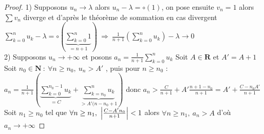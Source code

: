 			
			
		\begin{proof}
			{\small 1)} Supposons $u_n \to \lambda$ alors $u_n - \lambda = \circ (1)$, on pose ensuite $v_n = 1$ alors $\sum v_n$ diverge 
			et d'après le théorème de sommation en cas divergent \\ $\sum_{k=0}^{n} u_k - \lambda = \circ ( \underbrace{\sum_{k=0}^{n} 1}_{=n+1} ) ~
			\Rightarrow ~\frac{1}{n+1} ( \sum_{k=0}^{n} u_k ) - \lambda \to 0$ \\
			{\small 2)} Supposons $u_n \to +\infty$ et posons $a_n = \frac{1}{n+1} \sum_{k=0}^{n} u_k$
			Soit $A\in\mathbf{R}$ et $A'=A+1$ \\ Soit $n_0 \in\mathbf{N} ~:~\forall n\geq n_0 ,~u_n >A'$ , puis pour $n\geq n_0$ :\\
			$a_n = \frac{1}{n+1} ( \underbrace{\sum_{k=0}^{n_0-1} u_k}_{=C} + \underbrace{\sum_{k=n_0}^{n} u_k}_{>A'(n-n_0+1} )$ 
			donc $a_n > \frac{C}{n+1} + A'\frac{n+1-n_0}{n+1} = A' + \frac{C-n_0A'}{n+1}$ \\ 
			Soit $n_1\geq n_0$ tel que $\forall n\geq n_1 ,~\left\vert \frac{C-A'n_0}{n+1} \right\vert <1$ alors $\forall n\geq n_1 ,~a_n > A$ d'où $a_n \to +\infty$
		\end{proof} 

		\medskip 

